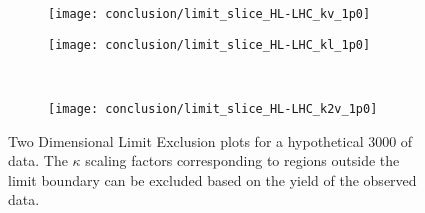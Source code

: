 \begin{figure}
    \centering
    \begin{subfigure}{0.48\textwidth} 
        \texttt{[image: conclusion/limit\_slice\_HL-LHC\_kv\_1p0]}
        \caption{}
        \label{fig:limit_slice_kv_1p0_future}
    \end{subfigure}
    \begin{subfigure}{0.48\textwidth}
        \texttt{[image: conclusion/limit\_slice\_HL-LHC\_kl\_1p0]}
        \caption{}
        \label{fig:limit_slice_kl_1p0_future}
    \end{subfigure}\\
    \begin{subfigure}{0.48\textwidth} 
        \texttt{[image: conclusion/limit\_slice\_HL-LHC\_k2v\_1p0]}
        \caption{}
        \label{fig:limit_slice_k2v_1p0_future}
    \end{subfigure}
    \caption{
        Two Dimensional Limit Exclusion plots for a hypothetical 3000 \ifb of data.
        The $\kappa$ scaling factors corresponding to regions outside the limit boundary
            can be excluded based on the yield of the observed data.
    }
    \label{fig:limit_slices_future}
\end{figure}


